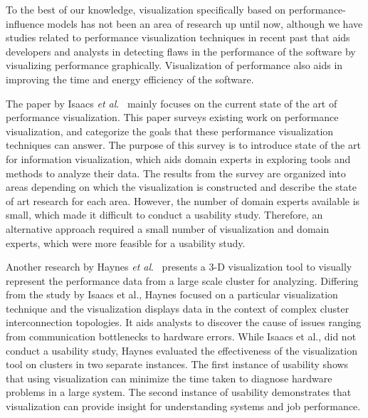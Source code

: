 \label{relatedwork}

To the best of our knowledge, visualization specifically based on performance-influence models has not been an area of research up until now, although we have studies related to performance visualization techniques in recent past that aids developers and analysts in detecting flaws in the performance of the software by visualizing performance graphically. Visualization of performance also aids in improving the time and energy efficiency of the software.


The paper by Isaacs \textit{et al}.~\cite{DBLP:conf/vissym/IsaacsGJGB0HB14}  mainly focuses on the current state of the art of performance visualization. This paper surveys existing work on performance visualization, and categorize the goals that these performance visualization techniques can answer. The purpose of this survey is to introduce state of the art for information visualization, which aids domain experts in exploring tools and methods to analyze their data.
The results from the survey are organized into areas depending on which the visualization is constructed and describe the state of art research for each area. However, the number of domain experts available is small, which made it difficult to conduct a usability study. Therefore, an alternative approach required a small number of visualization and domain experts, which were more feasible for a usability study.


Another research by Haynes \textit{et al}.~\cite{DBLP:conf/cluster/HaynesCR01} presents a 3-D visualization tool to visually represent the performance data from a large scale cluster for analyzing. Differing from the study by Isaacs et al., Haynes focused on a particular visualization technique and the visualization displays data in the context of complex cluster interconnection topologies. It aids analysts to discover the cause of issues ranging from communication bottlenecks to hardware errors. While Isaacs et al., did not conduct a usability study, Haynes evaluated the effectiveness of the visualization tool on clusters in two separate instances. The first instance of usability shows that using visualization can minimize the time taken to diagnose hardware problems in a large system. The second instance of usability demonstrates that visualization can provide insight for understanding systems and job performance. 

